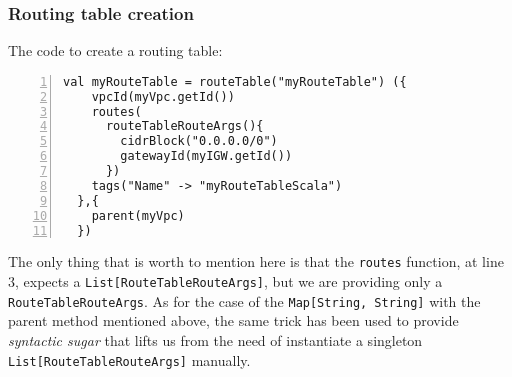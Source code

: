 \subsubsection{Routing table creation}
\label{sssec:routetable-creation-scala}
The code to create a routing table:\\
\begin{minipage}{\linewidth}
\begin{lstlisting}[numbers=left, numberstyle=\tiny, numbersep=-5pt, stepnumber=1]
  val myRouteTable = routeTable("myRouteTable") ({
    vpcId(myVpc.getId())
    routes(
      routeTableRouteArgs(){
        cidrBlock("0.0.0.0/0")
        gatewayId(myIGW.getId())
      })
    tags("Name" -> "myRouteTableScala")
  },{
    parent(myVpc)
  })
\end{lstlisting}
\end{minipage}
The only thing that is worth to mention here is that the \texttt{routes} function, at line 3, expects a \texttt{List[RouteTableRouteArgs]}, but we are providing only a \texttt{RouteTableRouteArgs}.
As for the case of the \texttt{Map[String, String]} with the parent method mentioned above, the same trick has been used to provide \textit{syntactic sugar} that lifts us from the need of instantiate a singleton \texttt{List[RouteTableRouteArgs]} manually.

